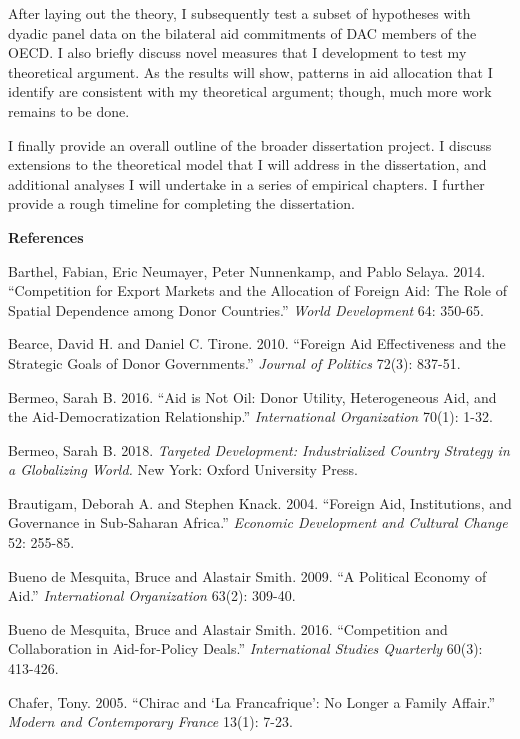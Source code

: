 \documentclass[12pt,]{article}
\begin{document}
After laying out the theory, I subsequently test a subset of hypotheses
with dyadic panel data on the bilateral aid commitments of DAC members
of the OECD. I also briefly discuss novel measures that I development to
test my theoretical argument. As the results will show, patterns in aid
allocation that I identify are consistent with my theoretical argument;
though, much more work remains to be done.

I finally provide an overall outline of the broader dissertation
project. I discuss extensions to the theoretical model that I will
address in the dissertation, and additional analyses I will undertake in
a series of empirical chapters. I further provide a rough timeline for
completing the dissertation.

\newpage
\Large
\setlength\parindent{-5pt}

\textbf{References} \normalsize \doublespacing

Barthel, Fabian, Eric Neumayer, Peter Nunnenkamp, and Pablo Selaya.
2014. ``Competition for Export Markets and the Allocation of Foreign
Aid: The Role of Spatial Dependence among Donor Countries.'' \emph{World
Development} 64: 350-65.

Bearce, David H. and Daniel C. Tirone. 2010. ``Foreign Aid Effectiveness
and the Strategic Goals of Donor Governments.'' \emph{Journal of
Politics} 72(3): 837-51.

Bermeo, Sarah B. 2016. ``Aid is Not Oil: Donor Utility, Heterogeneous
Aid, and the Aid-Democratization Relationship.'' \emph{International
Organization} 70(1): 1-32.

Bermeo, Sarah B. 2018. \emph{Targeted Development: Industrialized
Country Strategy in a Globalizing World.} New York: Oxford University
Press.

Brautigam, Deborah A. and Stephen Knack. 2004. ``Foreign Aid,
Institutions, and Governance in Sub-Saharan Africa.'' \emph{Economic
Development and Cultural Change} 52: 255-85.

Bueno de Mesquita, Bruce and Alastair Smith. 2009. ``A Political Economy
of Aid.'' \emph{International Organization} 63(2): 309-40.

Bueno de Mesquita, Bruce and Alastair Smith. 2016. ``Competition and
Collaboration in Aid-for-Policy Deals.'' \emph{International Studies
Quarterly} 60(3): 413-426.

Chafer, Tony. 2005. ``Chirac and `La Francafrique': No Longer a Family
Affair.'' \emph{Modern and Contemporary France} 13(1): 7-23.
\end{document}
